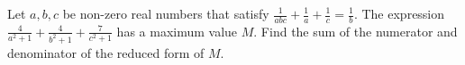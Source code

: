 Let $a, b, c$ be non-zero real numbers that satisfy $\frac{1}{abc} + \frac{1}{a} + \frac{1}{c} = \frac{1}{b}$. The expression $\frac{4}{a^2 + 1} + \frac{4}{b^2 + 1} + \frac{7}{c^2 + 1}$ has a maximum value $M$. Find the sum of the numerator and denominator of the reduced form of $M$.